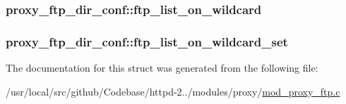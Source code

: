 \subsubsection[{\texorpdfstring{ftp\+\_\+list\+\_\+on\+\_\+wildcard}{ftp_list_on_wildcard}}]{ proxy\+\_\+ftp\+\_\+dir\+\_\+conf\+::ftp\+\_\+list\+\_\+on\+\_\+wildcard}\hypertarget{structproxy__ftp__dir__conf_a3ac690a3d21c2489a29a8959ccdd2242}{}\label{structproxy__ftp__dir__conf_a3ac690a3d21c2489a29a8959ccdd2242}
\subsubsection[{\texorpdfstring{ftp\+\_\+list\+\_\+on\+\_\+wildcard\+\_\+set}{ftp_list_on_wildcard_set}}]{ proxy\+\_\+ftp\+\_\+dir\+\_\+conf\+::ftp\+\_\+list\+\_\+on\+\_\+wildcard\+\_\+set}\hypertarget{structproxy__ftp__dir__conf_aa9c49dcc30a8352f840821a8bcec2b3e}{}\label{structproxy__ftp__dir__conf_aa9c49dcc30a8352f840821a8bcec2b3e}


The documentation for this struct was generated from the following file\+:\begin{DoxyCompactItemize}
\item 
/usr/local/src/github/\+Codebase/httpd-\/2../modules/proxy/\hyperlink{mod__proxy__ftp_8c}{mod\+\_\+proxy\+\_\+ftp.\+c}\end{DoxyCompactItemize}
